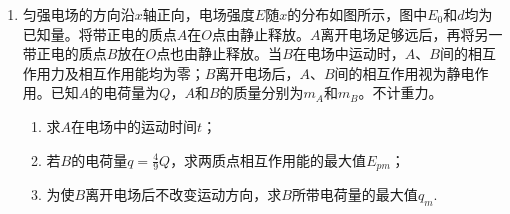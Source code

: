 \begin{enumerate}[leftmargin=0em]


\newpage
\item
{}
匀强电场的方向沿$ x $轴正向，电场强度$ E $随$ x $的分布如图所示，图中$ E_{0} $和$ d $均为已知量。将带正电的质点$ A $在$ O $点由静止释放。$ A $离开电场足够远后，再将另一带正电的质点$ B $放在$ O $点也由静止释放。当$ B $在电场中运动时，$ A $、$ B $间的相互作用力及相互作用能均为零；$ B $离开电场后，$ A $、$ B $间的相互作用视为静电作用。已知$ A $的电荷量为$ Q $，$ A $和$ B $的质量分别为$ m_{A} $和$ m_{B} $。不计重力。
\begin{enumerate}
\renewcommand{\labelenumi}{\arabic{enumi}.}
\item
求$ A $在电场中的运动时间$ t $；
\item 
若$ B $的电荷量$ q= \frac{ 4 }{ 9 } Q $，求两质点相互作用能的最大值$ E_{pm} $；
\item 
为使$ B $离开电场后不改变运动方向，求$ B $所带电荷量的最大值$ q_m $.



\end{enumerate}
\begin{figure}[h!]
\flushright

\end{figure}

\end{enumerate}
